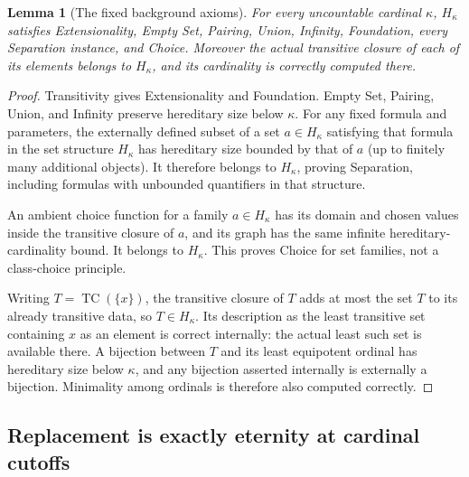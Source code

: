 \documentclass[11pt,letterpaper]{article}
\newtheorem{lemma}[theorem]{Lemma}
\theoremstyle{definition}
\theoremstyle{remark}
\newcommand{\TC}{\operatorname{TC}}
\begin{document}
\begin{lemma}[The fixed background axioms]
\label{lem:H-background}
For every uncountable cardinal $\kappa$, $H_\kappa$ satisfies
Extensionality, Empty Set, Pairing, Union, Infinity, Foundation, every
Separation instance, and Choice. Moreover the actual transitive closure of
each of its elements belongs to $H_\kappa$, and its cardinality is correctly
computed there.
\end{lemma}
\begin{proof}
Transitivity gives Extensionality and Foundation. Empty Set, Pairing, Union,
and Infinity preserve hereditary size below $\kappa$. For any fixed formula
and parameters, the externally defined subset of a set $a\in H_\kappa$
satisfying that formula in the set structure $H_\kappa$ has hereditary size
bounded by that of $a$ (up to finitely many additional objects). It therefore
belongs to $H_\kappa$, proving Separation, including formulas with unbounded
quantifiers in that structure.

An ambient choice function for a family $a\in H_\kappa$ has its domain and
chosen values inside the transitive closure of $a$, and its graph has the
same infinite hereditary-cardinality bound. It belongs to $H_\kappa$.
This proves Choice for set families, not a class-choice principle.

Writing $T=\TC(\{x\})$, the transitive closure of $T$ adds at most the set
$T$ to its already transitive data, so $T\in H_\kappa$. Its description as
the least transitive set containing $x$ as an element is correct internally:
the actual least such set is available there. A bijection between $T$ and
its least equipotent ordinal has hereditary size below $\kappa$, and any
bijection asserted internally is externally a bijection. Minimality among
ordinals is therefore also computed correctly.
\end{proof}

\subsection{Replacement is exactly eternity at cardinal cutoffs}
\end{document}
